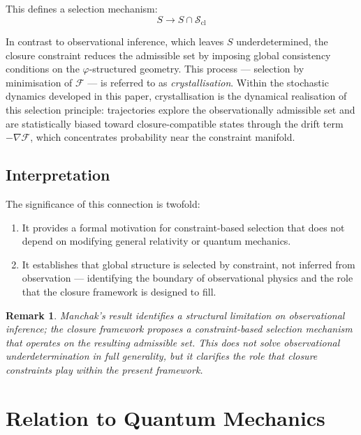 \documentclass[12pt]{article}
\newtheorem{remark}[theorem]{Remark}
\newcommand{\Fcal}{\mathcal{F}}
\newcommand{\Scl}{\mathcal{S}_{\mathrm{cl}}}
\newcommand{\phig}{\varphi}
\begin{document}
This defines a selection mechanism:
\begin{equation}
    S \longrightarrow S \cap \Scl
\end{equation}

In contrast to observational inference, which leaves $S$ underdetermined, the closure constraint reduces the admissible set by imposing global consistency conditions on the $\phig$-structured geometry. This process --- selection by minimisation of $\Fcal$ --- is referred to as \textit{crystallisation}. Within the stochastic dynamics developed in this paper, crystallisation is the dynamical realisation of this selection principle: trajectories explore the observationally admissible set and are statistically biased toward closure-compatible states through the drift term $-\nabla\Fcal$, which concentrates probability near the constraint manifold.

\subsection{Interpretation}

The significance of this connection is twofold:
\begin{enumerate}
    \item It provides a formal motivation for constraint-based selection that does not depend on modifying general relativity or quantum mechanics.
    \item It establishes that global structure is selected by constraint, not inferred from observation --- identifying the boundary of observational physics and the role that the closure framework is designed to fill.
\end{enumerate}

\begin{remark}
Manchak's result identifies a structural limitation on observational inference; the closure framework proposes a constraint-based selection mechanism that operates on the resulting admissible set. This does not solve observational underdetermination in full generality, but it clarifies the role that closure constraints play within the present framework.
\end{remark}

\section{Relation to Quantum Mechanics}\label{sec:QM}
\end{document}
